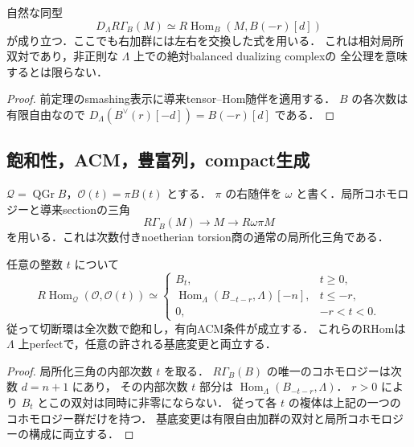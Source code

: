 \begin{corollary}[相対局所双対]\label{cor:finite-relative-local-duality}
自然な同型
\[
 D_\Lambda R\Gamma_B(M)
       \simeq R\!\operatorname{Hom}_B(M,B(-r)[d])
\]
が成り立つ．ここでも右加群には左右を交換した式を用いる．
これは相対局所双対であり，非正則な $\Lambda$ 上での絶対balanced dualizing complexの
全公理を意味するとは限らない．
\end{corollary}
\begin{proof}
前定理のsmashing表示に導来tensor--Hom随伴を適用する．
$B$ の各次数は有限自由なので
$D_\Lambda(B^\vee(r)[-d])=B(-r)[d]$ である．
\end{proof}

\subsection{飽和性，ACM，豊富列，compact生成}
$\mathcal Q=\operatorname{QGr}B$，$\mathcal O(t)=\pi B(t)$ とする．
$\pi$ の右随伴を $\omega$ と書く．局所コホモロジーと導来sectionの三角
\[
 R\Gamma_B(M)\longrightarrow M\longrightarrow R\omega\pi M
\]
を用いる．これは次数付きnoetherian torsion商の通常の局所化三角である．

\begin{theorem}\label{thm:finite-tails-cohomology}
任意の整数 $t$ について
\[
 R\!\operatorname{Hom}_{\mathcal Q}(\mathcal O,\mathcal O(t))
 \simeq
 \begin{cases}
  B_t,&t\ge0,\\
  \operatorname{Hom}_\Lambda(B_{-t-r},\Lambda)[-n],&t\le-r,\\
  0,&-r<t<0.
 \end{cases}
\]
従って切断環は全次数で飽和し，有向ACM条件が成立する．
これらのRHomは $\Lambda$ 上perfectで，任意の許される基底変更と両立する．
\end{theorem}
\begin{proof}
局所化三角の内部次数 $t$ を取る．
$R\Gamma_B(B)$ の唯一のコホモロジーは次数 $d=n+1$ にあり，
その内部次数 $t$ 部分は $\operatorname{Hom}_\Lambda(B_{-t-r},\Lambda)$．
$r>0$ により $B_t$ とこの双対は同時に非零にならない．
従って各 $t$ の複体は上記の一つのコホモロジー群だけを持つ．
基底変更は有限自由加群の双対と局所コホモロジーの構成に両立する．
\end{proof}

